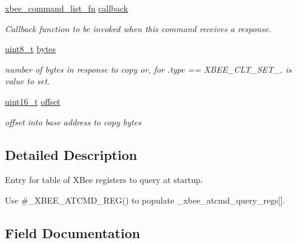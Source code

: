 \begin{DoxyCompactItemize}
\hyperlink{group__xbee__atcmd_ga7909235eb77ba64c93742f8f9013d7fb}{xbee\+\_\+command\+\_\+list\+\_\+fn} \hyperlink{structxbee__atcmd__reg__t_a2611714f3f3d031a2c5f8202f2544567}{callback}
\begin{DoxyCompactList}\small\item\em Callback function to be invoked when this command receives a response. \end{DoxyCompactList}\item 
\hyperlink{group__hal__dos_gae1affc9ca37cfb624959c866a73f83c2}{uint8\+\_\+t} \hyperlink{structxbee__atcmd__reg__t_a6b05ea38740bd6a3d857c312ef67e40e}{bytes}
\begin{DoxyCompactList}\small\item\em number of bytes in response to copy or, for .type == X\+B\+E\+E\+\_\+\+C\+L\+T\+\_\+\+S\+E\+T\+\_, is value to set. \end{DoxyCompactList}\item 
\mbox{\label{structxbee__atcmd__reg__t_ac681806181c80437cfab37335f62ff39}} 
\hyperlink{group__hal__dos_ga5a8b2dc9e45a9ee81a94ef304fb62505}{uint16\+\_\+t} \hyperlink{structxbee__atcmd__reg__t_ac681806181c80437cfab37335f62ff39}{offset}
\begin{DoxyCompactList}\small\item\em offset into base address to copy bytes \end{DoxyCompactList}\end{DoxyCompactItemize}


\subsection{Detailed Description}
Entry for table of X\+Bee registers to query at startup. 

Use \#\+\_\+\+X\+B\+E\+E\+\_\+\+A\+T\+C\+M\+D\+\_\+\+R\+E\+G() to populate \+\_\+xbee\+\_\+atcmd\+\_\+query\+\_\+regs\mbox{[}\mbox{]}. 

\subsection{Field Documentation}
\mbox{\label{structxbee__atcmd__reg__t_a6b05ea38740bd6a3d857c312ef67e40e}} 
